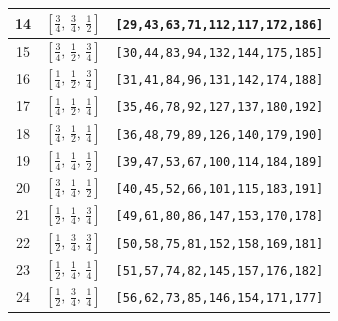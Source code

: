 \documentclass[fleqn,8pt]{jsarticle}
\begin{document}
\begin{longtable}{ccc}
14 & $\left[ \frac{3}{4},\, \frac{3}{4},\, \frac{1}{2} \right]$ & {\tt [29,43,63,71,112,117,172,186]} \\ \hline
15 & $\left[ \frac{3}{4},\, \frac{1}{2},\, \frac{3}{4} \right]$ & {\tt [30,44,83,94,132,144,175,185]} \\ \hline
16 & $\left[ \frac{1}{4},\, \frac{1}{2},\, \frac{3}{4} \right]$ & {\tt [31,41,84,96,131,142,174,188]} \\ \hline
17 & $\left[ \frac{1}{4},\, \frac{1}{2},\, \frac{1}{4} \right]$ & {\tt [35,46,78,92,127,137,180,192]} \\ \hline
18 & $\left[ \frac{3}{4},\, \frac{1}{2},\, \frac{1}{4} \right]$ & {\tt [36,48,79,89,126,140,179,190]} \\ \hline
19 & $\left[ \frac{1}{4},\, \frac{1}{4},\, \frac{1}{2} \right]$ & {\tt [39,47,53,67,100,114,184,189]} \\ \hline
20 & $\left[ \frac{3}{4},\, \frac{1}{4},\, \frac{1}{2} \right]$ & {\tt [40,45,52,66,101,115,183,191]} \\ \hline
21 & $\left[ \frac{1}{2},\, \frac{1}{4},\, \frac{3}{4} \right]$ & {\tt [49,61,80,86,147,153,170,178]} \\ \hline
22 & $\left[ \frac{1}{2},\, \frac{3}{4},\, \frac{3}{4} \right]$ & {\tt [50,58,75,81,152,158,169,181]} \\ \hline
23 & $\left[ \frac{1}{2},\, \frac{1}{4},\, \frac{1}{4} \right]$ & {\tt [51,57,74,82,145,157,176,182]} \\ \hline
24 & $\left[ \frac{1}{2},\, \frac{3}{4},\, \frac{1}{4} \right]$ & {\tt [56,62,73,85,146,154,171,177]} \\
\end{longtable}
\renewcommand{\arraystretch}{1.2}
\end{document}
